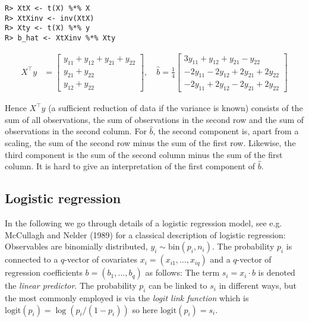 \begin{verbatim}
R> XtX <- t(X) %*% X
R> XtXinv <- inv(XtX)
R> Xty <- t(X) %*% y
R> b_hat <- XtXinv %*% Xty
\end{verbatim}

\begin{align}
X^\top y &= \left[\begin{matrix}y_{11} + y_{12} + y_{21} + y_{22}\\y_{21} + y_{22}\\y_{12} + y_{22}\end{matrix}\right] , 
\quad
\hat{b} = \frac{1}{4}  \left[\begin{matrix}3 y_{11} + y_{12} + y_{21} - y_{22}\\- 2 y_{11} - 2 y_{12} + 2 y_{21} + 2 y_{22}\\- 2 y_{11} + 2 y_{12} - 2 y_{21} + 2 y_{22}\end{matrix}\right]
\end{align}

Hence \(X^\top y\) (a sufficient reduction of data if the variance is known)
consists of the sum of all observations, the sum of
observations in the second row and the sum of observations in the second column. For \(\hat{b}\), the second component is, apart from a scaling, the sum of the second row minus the sum of the first row. Likewise, the third component is the sum of the second column minus the sum of the first column. It is hard to give an interpretation of the first component of \(\hat{b}\).

\hypertarget{logistic-regression}{%
\subsection{Logistic regression}\label{logistic-regression}}

In the following we go through details of a logistic regression model,
see e.g. McCullagh and Nelder (1989) for a classical description of logistic
regression: Observables are binomially distributed, \(y_i \sim \text{bin}(p_i, n_i)\). The probability \(p_i\) is connected to a
\(q\)-vector of covariates \(x_i=(x_{i1}, \dots, x_{iq})\) and a
\(q\)-vector of regression coefficients \(b=(b_1, \dots, b_q)\) as
follows: The term \(s_i = x_i \cdot b\) is denoted the \emph{linear
predictor}. The probability \(p_i\) can be linked to \(s_i\) in different
ways, but the most commonly employed is via the \emph{logit link
function} which is \(\text{logit}(p_i) = \log(p_i/(1-p_i))\) so here
\(\text{logit}(p_i) = s_i\).

